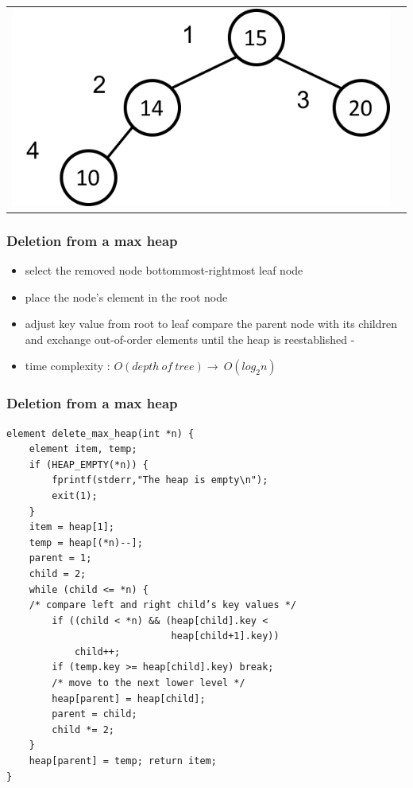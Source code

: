 \documentclass[newPxFont,sthlmFooter,nooffset]{beamer}
\begin{document}
\begin{frame}[t]
\begin{tabular}{p{} p{}}
    \includegraphics[height=0.3\textheight]{./figures/fig14_heap_delete3.png}
\\
  \end{tabular}
\end{frame}


\begin{frame}[t]
  \frametitle{Deletion from a max heap}
  \begin{itemize}
  \item select the removed node bottommost-rightmost leaf node
  \item place the node’s element in the root node
  \item adjust key value
    from root to leaf compare the parent node with its children and
    exchange out-of-order elements until the heap is reestablished -
  \item time complexity : $O(depth~of~ tree) \rightarrow~ O(log_2n)$
  \end{itemize}

\end{frame}


\begin{frame}[t, fragile]
  \frametitle{Deletion from a max heap}
  \begin{lstlisting}
element delete_max_heap(int *n) { 
    element item, temp;
    if (HEAP_EMPTY(*n)) {
        fprintf(stderr,"The heap is empty\n");
        exit(1); 
    }
    item = heap[1];
    temp = heap[(*n)--]; 
    parent = 1; 
    child = 2; 
    while (child <= *n) {
    /* compare left and right child’s key values */ 
        if ((child < *n) && (heap[child].key <
                             heap[child+1].key))
            child++;
        if (temp.key >= heap[child].key) break; 
        /* move to the next lower level */ 
        heap[parent] = heap[child];
        parent = child;
        child *= 2;
    }
    heap[parent] = temp; return item;
}    
  \end{lstlisting}
\end{frame}
\end{document}
